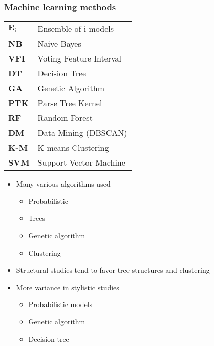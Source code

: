 \documentclass[t,12pt,pdftex]{beamer}
\begin{document}
\begin{frame}
	\frametitle{Machine learning methods}
	
\begin{table}[ht]
\centering
{}
\caption{Methods used in studies}
\label{table:meth}
\end{table}	

\begin{footnotesize}
\begin{longtable}{ll}

{$\mathbf{E_i}$} & Ensemble of i models \\
\textbf{NB} & Naive Bayes\\
\textbf{VFI} & Voting Feature Interval\\
\textbf{DT} & Decision Tree\\
\textbf{GA} & Genetic Algorithm\\
\textbf{PTK} & Parse Tree Kernel\\
\textbf{RF} & Random Forest\\
\textbf{DM} & Data Mining (DBSCAN)\\
\textbf{K-M} & K-means Clustering\\
\textbf{SVM} & Support Vector Machine

\end{longtable}
\end{footnotesize}

\end{frame}

\begin{frame}
	\vspace{0.5in}
	\begin{itemize}
	\item Many various algorithms used
	\begin{itemize}
		\item Probabilistic 
		\item Trees
		\item Genetic algorithm
		\item Clustering
	\end{itemize}
	\item Structural studies tend to favor tree-structures and clustering
	\item More variance in stylistic studies 
	\begin{itemize}
		\item Probabilistic models
		\item Genetic algorithm
		\item Decision tree
	\end{itemize}
	\end{itemize}
\end{frame}
\end{document}
